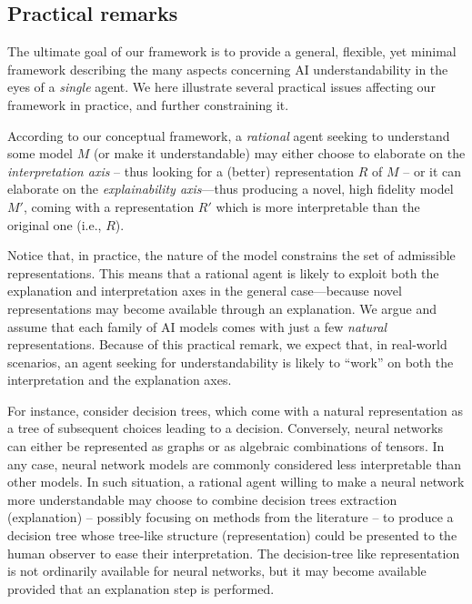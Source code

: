 \documentclass[12pt,a4paper,openright,twoside]{book}
\begin{document}
\subsection{Practical remarks}

The ultimate goal of our framework is to provide a general, flexible, yet minimal framework describing the many aspects concerning AI understandability in the eyes of a \emph{single} agent.
%
We here illustrate several practical issues affecting our framework in practice, and further constraining it.

According to our conceptual framework, a \emph{rational} agent seeking to understand some model $M$ (or make it understandable) may either choose to elaborate on the \emph{interpretation axis} -- thus looking for a (better) representation $R$ of $M$ -- or it can elaborate on the \emph{explainability axis}---thus producing a novel, high fidelity model $M'$, coming with a representation $R'$ which is more interpretable than the original one (i.e., $R$).

Notice that, in practice, the nature of the model constrains the set of admissible representations.
%
This means that a rational agent is likely to exploit both the explanation and interpretation axes in the general case---because novel representations may become available through an explanation.
%
We argue and assume that each family of AI models comes with just a few \emph{natural} representations.
%
Because of this practical remark, we expect that, in real-world scenarios, an agent seeking for understandability is likely to ``work'' on both the interpretation and the explanation axes.

For instance, consider decision trees, which come with a natural representation as a tree of subsequent choices leading to a decision.
%
Conversely, neural networks can either be represented as graphs or as algebraic combinations of tensors.
%
In any case, neural network models are commonly considered less interpretable than other models.
%
In such situation, a rational agent willing to make a neural network more understandable may choose to combine decision trees extraction (explanation) -- possibly focusing on methods from the literature \cite{AndrewsDT95,xailp-woa2019} -- to produce a decision tree whose tree-like structure (representation) could be presented to the human observer to ease their interpretation.
%
The decision-tree like representation is not ordinarily available for neural networks, but it may become available provided that an explanation step is performed.
\end{document}
